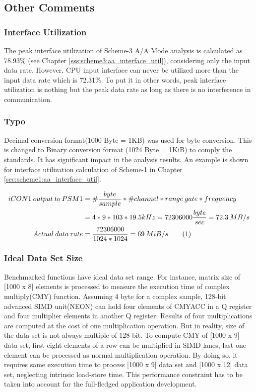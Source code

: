 \subsection{Other Comments}
\subsubsection{Interface Utilization}
The peak interface utilization of Scheme-3 A/A Mode analysis is calculated as 78.93\% (see Chapter \ref{sss:scheme3:aa_interface_util}), considering only the input data rate. However, CPU input interface can never be utilized more than the input data rate which is 72.31\%. To put it in other words, peak interface utilization is nothing but the peak data rate as long as there is no interference in communication. 

\subsubsection{Typo}
Decimal conversion format(1000 Byte = 1KB) was used for byte conversion. This is changed to Binary conversion format (1024 Byte = 1KiB) to comply the standards. It has significant impact in the analysis results. An example is shown for interface utilization calculation of Scheme-1 in Chapter \ref{sec:scheme1:aa_interface_util}.

\begin{align*}
	\label{equ:mm:typo}
	iCON1 \: output \: to \: PSM1 &= \#\frac{byte}{sample} * \#channel * range \: gate * frequency \\
	&= 4 * 9 * 103 * 19.5kHz = 72306000 \frac{byte}{sec} = 72.3 \: MB/s \\
	Actual \: data \: rate &= \frac{72306000}{1024 * 1024} = 69 \: MiB/s \stepcounter{equation}\tag{\theequation}
\end{align*}

\subsubsection{Ideal Data Set Size}
Benchmarked functions have ideal data set range. For instance, matrix size of [1000 x 8] elements is processed to measure the execution time of complex multiply(CMY) function. Assuming 4 byte for a complex sample, 128-bit advanced SIMD unit(NEON) can hold four elements of CMYACC in a Q register and four multiplier elements in another Q register. Results of four multiplications are computed at the cost of one multiplication operation. But in reality, size of the data set is not always multiple of 128-bit. To compute CMY of [1000 x 9] data set, first eight elements of a row can be multiplied in SIMD lanes, last one element can be processed as normal multiplication operation. By doing so, it requires same execution time to process [1000 x 9] data set and [1000 x 12] data set, neglecting intrinsic load-store time. This performance constraint has to be taken into account for the full-fledged application development.

